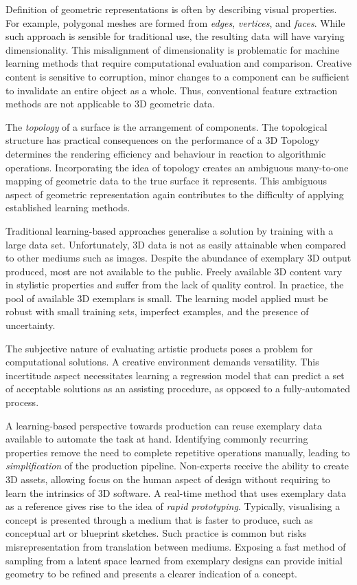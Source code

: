 \documentclass[a4paper, 11pt, onecolumn]{article} %
\numberwithin{equation}{section} %
\numberwithin{figure}{section} %
\numberwithin{table}{section} %
\begin{document}
Definition of geometric representations is often by describing visual properties. For example, polygonal meshes are formed from \textit{edges}, \textit{vertices},  and \textit{faces}. While such approach is sensible for traditional use, the resulting data will have varying dimensionality. This misalignment of dimensionality is problematic for machine learning methods that require computational evaluation and comparison. Creative content is sensitive to corruption, minor changes to a component can be sufficient to invalidate an entire object as a whole. Thus, conventional feature extraction methods are not applicable to 3D geometric data.

The \textit{topology} of a surface is the arrangement of components. The topological structure has practical consequences on the performance of a 3D Topology determines the rendering efficiency and behaviour in reaction to algorithmic operations. Incorporating the idea of topology creates an ambiguous many-to-one mapping of geometric data to the true surface it represents. This ambiguous aspect of geometric representation again contributes to the difficulty of applying established learning methods.

Traditional learning-based approaches generalise a solution by training with a large data set. Unfortunately, 3D data is not as easily attainable when compared to other mediums such as images. Despite the abundance of exemplary 3D output produced, most are not available to the public. Freely available 3D content vary in stylistic properties and suffer from the lack of quality control. In practice, the pool of available 3D exemplars is small. The learning model applied must be robust with small training sets, imperfect examples, and the presence of uncertainty.

The subjective nature of evaluating artistic products poses a problem for computational solutions. A creative environment demands versatility. This incertitude aspect necessitates learning a regression model that can predict a set of acceptable solutions as an assisting procedure, as opposed to a fully-automated process.

A learning-based perspective towards production can reuse exemplary data available to automate the task at hand.
Identifying commonly recurring properties remove the need to complete repetitive operations manually, leading to \textit{simplification} of the production pipeline. Non-experts receive the ability to create 3D assets, allowing focus on the human aspect of design without requiring to learn the intrinsics of 3D software. 
A real-time method that uses exemplary data as a reference gives rise to the idea of \textit{rapid prototyping}. Typically, visualising a concept is presented through a medium that is faster to produce, such as conceptual art or blueprint sketches. Such practice is common but risks misrepresentation from translation between mediums. Exposing a fast method of sampling from a latent space learned from exemplary designs can provide initial geometry to be refined and presents a clearer indication of a concept.
\end{document}
